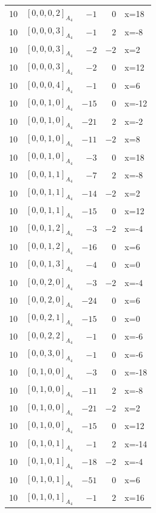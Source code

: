 \documentclass[11pt]{article}
\newcommand{\Dynkin}[1]{#1}
\begin{document}
\begin{longtable}{r l r r l}
10 & $\Dynkin{[0,0,0,2]_{A_4}}$ & $-1$ & $0$ & x=18\\
10 & $\Dynkin{[0,0,0,3]_{A_4}}$ & $-1$ & $2$ & x=-8\\
10 & $\Dynkin{[0,0,0,3]_{A_4}}$ & $-2$ & $-2$ & x=2\\
10 & $\Dynkin{[0,0,0,3]_{A_4}}$ & $-2$ & $0$ & x=12\\
10 & $\Dynkin{[0,0,0,4]_{A_4}}$ & $-1$ & $0$ & x=6\\
10 & $\Dynkin{[0,0,1,0]_{A_4}}$ & $-15$ & $0$ & x=-12\\
10 & $\Dynkin{[0,0,1,0]_{A_4}}$ & $-21$ & $2$ & x=-2\\
10 & $\Dynkin{[0,0,1,0]_{A_4}}$ & $-11$ & $-2$ & x=8\\
10 & $\Dynkin{[0,0,1,0]_{A_4}}$ & $-3$ & $0$ & x=18\\
10 & $\Dynkin{[0,0,1,1]_{A_4}}$ & $-7$ & $2$ & x=-8\\
10 & $\Dynkin{[0,0,1,1]_{A_4}}$ & $-14$ & $-2$ & x=2\\
10 & $\Dynkin{[0,0,1,1]_{A_4}}$ & $-15$ & $0$ & x=12\\
10 & $\Dynkin{[0,0,1,2]_{A_4}}$ & $-3$ & $-2$ & x=-4\\
10 & $\Dynkin{[0,0,1,2]_{A_4}}$ & $-16$ & $0$ & x=6\\
10 & $\Dynkin{[0,0,1,3]_{A_4}}$ & $-4$ & $0$ & x=0\\
10 & $\Dynkin{[0,0,2,0]_{A_4}}$ & $-3$ & $-2$ & x=-4\\
10 & $\Dynkin{[0,0,2,0]_{A_4}}$ & $-24$ & $0$ & x=6\\
10 & $\Dynkin{[0,0,2,1]_{A_4}}$ & $-15$ & $0$ & x=0\\
10 & $\Dynkin{[0,0,2,2]_{A_4}}$ & $-1$ & $0$ & x=-6\\
10 & $\Dynkin{[0,0,3,0]_{A_4}}$ & $-1$ & $0$ & x=-6\\
10 & $\Dynkin{[0,1,0,0]_{A_4}}$ & $-3$ & $0$ & x=-18\\
10 & $\Dynkin{[0,1,0,0]_{A_4}}$ & $-11$ & $2$ & x=-8\\
10 & $\Dynkin{[0,1,0,0]_{A_4}}$ & $-21$ & $-2$ & x=2\\
10 & $\Dynkin{[0,1,0,0]_{A_4}}$ & $-15$ & $0$ & x=12\\
10 & $\Dynkin{[0,1,0,1]_{A_4}}$ & $-1$ & $2$ & x=-14\\
10 & $\Dynkin{[0,1,0,1]_{A_4}}$ & $-18$ & $-2$ & x=-4\\
10 & $\Dynkin{[0,1,0,1]_{A_4}}$ & $-51$ & $0$ & x=6\\
10 & $\Dynkin{[0,1,0,1]_{A_4}}$ & $-1$ & $2$ & x=16\\

\end{longtable}
\end{document}
